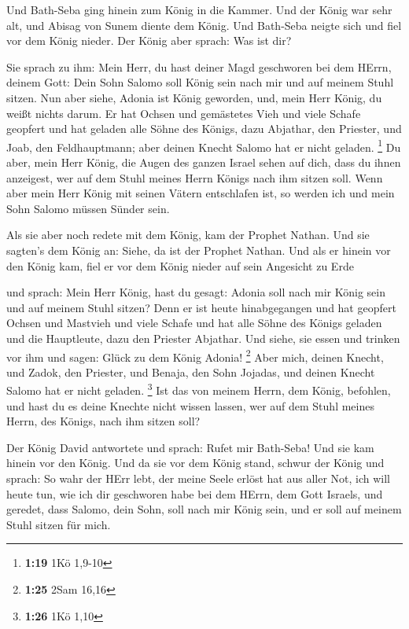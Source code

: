  Und Bath-Seba ging hinein zum König in die Kammer. Und der
König war sehr alt, und Abisag von Sunem diente dem König. 
Und Bath-Seba neigte sich und fiel vor dem König nieder. Der König aber
sprach: Was ist dir?

 Sie sprach zu ihm: Mein Herr, du hast deiner Magd
geschworen bei dem HErrn, deinem Gott: Dein Sohn Salomo soll König sein
nach mir und auf meinem Stuhl sitzen.  Nun aber siehe,
Adonia ist König geworden, und, mein Herr König, du weißt nichts darum.
 Er hat Ochsen und gemästetes Vieh und viele Schafe
geopfert und hat geladen alle Söhne des Königs, dazu Abjathar, den
Priester, und Joab, den Feldhauptmann; aber deinen Knecht Salomo hat er
nicht geladen. \footnote{\textbf{1:19} 1Kö 1,9-10}  Du
aber, mein Herr König, die Augen des ganzen Israel sehen auf dich, dass
du ihnen anzeigest, wer auf dem Stuhl meines Herrn Königs nach ihm
sitzen soll.  Wenn aber mein Herr König mit seinen Vätern
entschlafen ist, so werden ich und mein Sohn Salomo müssen Sünder sein.

 Als sie aber noch redete mit dem König, kam der Prophet
Nathan.  Und sie sagten's dem König an: Siehe, da ist der
Prophet Nathan. Und als er hinein vor den König kam, fiel er vor dem
König nieder auf sein Angesicht zu Erde

 und sprach: Mein Herr König, hast du gesagt: Adonia soll
nach mir König sein und auf meinem Stuhl sitzen?  Denn er
ist heute hinabgegangen und hat geopfert Ochsen und Mastvieh und viele
Schafe und hat alle Söhne des Königs geladen und die Hauptleute, dazu
den Priester Abjathar. Und siehe, sie essen und trinken vor ihm und
sagen: Glück zu dem König Adonia! \footnote{\textbf{1:25} 2Sam 16,16}
 Aber mich, deinen Knecht, und Zadok, den Priester, und
Benaja, den Sohn Jojadas, und deinen Knecht Salomo hat er nicht geladen.
\footnote{\textbf{1:26} 1Kö 1,10}  Ist das von meinem
Herrn, dem König, befohlen, und hast du es deine Knechte nicht wissen
lassen, wer auf dem Stuhl meines Herrn, des Königs, nach ihm sitzen
soll?

 Der König David antwortete und sprach: Rufet mir
Bath-Seba! Und sie kam hinein vor den König. Und da sie vor dem König
stand,  schwur der König und sprach: So wahr der HErr lebt,
der meine Seele erlöst hat aus aller Not,  ich will heute
tun, wie ich dir geschworen habe bei dem HErrn, dem Gott Israels, und
geredet, dass Salomo, dein Sohn, soll nach mir König sein, und er soll
auf meinem Stuhl sitzen für mich.

